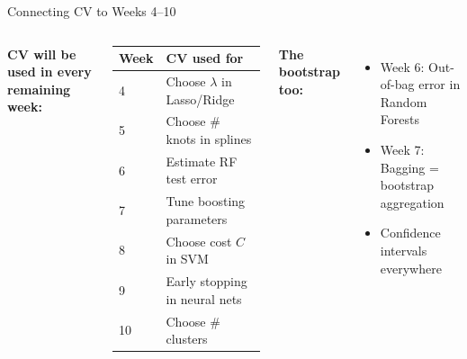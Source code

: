 \documentclass[aspectratio=169, 11pt]{beamer}
\begin{document}
\begin{frame}{Connecting CV to Weeks 4--10}
\begin{columns}
\textbf{CV will be used in every remaining week:}

\begin{tabular}{ll}
\toprule
Week & CV used for \\
\midrule
4 & Choose $\lambda$ in Lasso/Ridge \\
5 & Choose \# knots in splines \\
6 & Estimate RF test error \\
7 & Tune boosting parameters \\
8 & Choose cost $C$ in SVM \\
9 & Early stopping in neural nets \\
10 & Choose \# clusters \\
\bottomrule
\end{tabular}

\textbf{The bootstrap too:}

\begin{itemize}
  \item Week 6: Out-of-bag error in Random Forests
  \item Week 7: Bagging = bootstrap aggregation
  \item Confidence intervals everywhere
\end{itemize}

\vspace{0.5em}
\centering
{}
\end{columns}
\end{frame}
\end{document}
